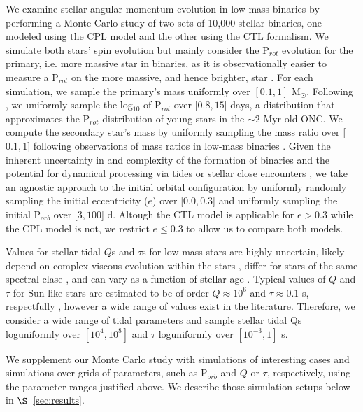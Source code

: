 \documentclass[twocolumn]{aastex61}
\begin{document}
We examine stellar angular momentum evolution in low-mass binaries by performing a Monte Carlo study of two sets of 10,000 stellar binaries, one modeled using the CPL model and the other using the CTL formalism.  We simulate both stars' spin evolution but mainly consider the P$_{rot}$ evolution for the primary, i.e. more massive star in binaries, as it is observationally easier to measure a P$_{rot}$ on the more massive, and hence brighter, star \citep[e.g.][]{Meibom2006,Lurie2017}. For each simulation, we sample the primary's mass uniformly over $[0.1, 1]$ M$_{\odot}$. Following \citet{Matt2015}, we uniformly sample the log$_{10}$ of P$_{rot}$ over [$0.8,15$] days, a distribution that approximates the P$_{rot}$ distribution of young stars in the ${\sim}2$ Myr old ONC.  We compute the secondary star's mass by uniformly sampling the mass ratio over [$0.1, 1$] following observations of mass ratios in low-mass binaries \citep{Raghavan2010,Moe2018}. Given the inherent uncertainty in and complexity of the formation of binaries \citep[e.g.][]{Bonnell1994,Bate2000,Bate2002,Moe2018} and the potential for dynamical processing via tides or stellar close encounters \citep[e.g.][]{Mardling2001,Hurley2002,Ivanova2005,Meibom2005}, we take an agnostic approach to the initial orbital configuration by uniformly randomly sampling the initial eccentricity ($e$) over [$0.0,0.3$] and uniformly sampling the initial P$_{orb}$ over [$3,100$] d. Altough the CTL model is applicable for $e > 0.3$ while the CPL model is not, we restrict $e \leq 0.3$ to allow us to compare both models.

Values for stellar tidal $Q$s and $\tau$s for low-mass stars are highly uncertain, likely depend on complex viscous evolution within the stars \citep{Ogilvie2007}, differ for stars of the same spectral clase \citep{Barker2009}, and can vary as a function of stellar age \citep{Bolmont2016}. Typical values of $Q$ and $\tau$ for Sun-like stars are estimated to be of order $Q \approx 10^6$ and $\tau \approx 0.1$ s, respectfully \citep[e.g.][]{Meibom2005,Ogilvie2007,Jackson2009}, however a wide range of values exist in the literature.  Therefore, we consider a wide range of tidal parameters and sample stellar tidal Qs loguniformly over $[10^4,10^8]$ and $\tau$ loguniformly over $[10^{-3},1]$ s.

We supplement our Monte Carlo study with simulations of interesting cases and simulations over grids of parameters, such as P$_{orb}$ and $Q$ or $\tau$, respectively, using the parameter ranges justified above. We describe those simulation setups below in $\S$~\ref{sec:results}. 
\end{document}

